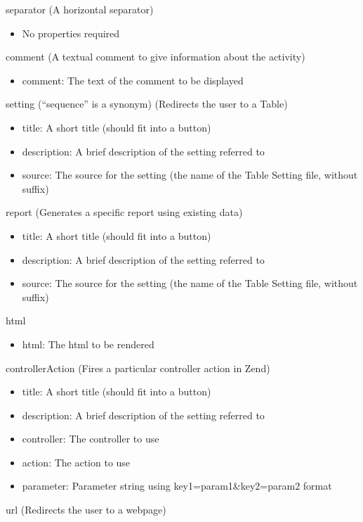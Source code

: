\documentclass[12pt]{article}
\begin{document}
\begin{appendices}
\begin{framed}
\begin{spacing}{1.0}
\noindent
separator (A horizontal separator)
\begin{itemize}
    \item No properties required
\end{itemize}
comment (A textual comment to give information about the activity)
\begin{itemize}
    \item comment: The text of the comment to be displayed
\end{itemize}
setting (“sequence” is a synonym) (Redirects the user to a Table)
\begin{itemize}
    \item title: A short title (should fit into a button)
    \item description: A brief description of the setting referred to
    \item source: The source for the setting (the name of the Table Setting file, without suffix)
\end{itemize}
report (Generates a specific report using existing data)
\begin{itemize}
    \item title: A short title (should fit into a button)
    \item description: A brief description of the setting referred to
    \item source: The source for the setting (the name of the Table Setting file, without suffix)
\end{itemize}
html
\begin{itemize}
    \item html: The html to be rendered
\end{itemize}
controllerAction (Fires a particular controller action in Zend)
\begin{itemize}
    \item title: A short title (should fit into a button)
    \item description: A brief description of the setting referred to
    \item controller: The controller to use
    \item action: The action to use
    \item parameter: Parameter string using key1=param1\&key2=param2 format
\end{itemize}
url (Redirects the user to a webpage)
\begin{itemize}

\end{itemize}
\end{spacing}
\end{framed}
\end{appendices}
\end{document}
